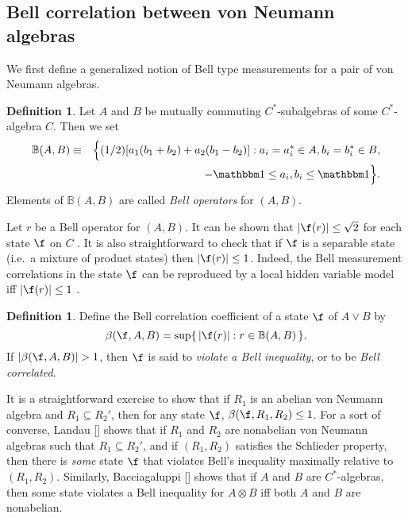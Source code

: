 \documentclass[11pt]{article}
\newcommand{\abs}[1]{|#1|}
\theoremstyle{definition}
\theoremstyle{definition}
\newtheorem{defn}[thm]{Definition}
\theoremstyle{remark}
\def\7#1{{\mathbb #1}}
\def\8#1{{\mathbbm #1}}
\begin{document}
\subsection{Bell correlation between von Neumann algebras}
\label{bell}

We first define a generalized notion of Bell type measurements for a
pair of von Neumann algebras.

\begin{defn} Let $A$ and $B$ be mutually commuting $C^*$-subalgebras
  of some $C^*$-algebra $C$.  Then we set \begin{eqnarray*} \7B (A,B)
    &\equiv & \Bigl\{ (1/2) [a_1(b_1+b_2)+a_2(b_1-b_2)] : a_i=a_i^*\in
    A, b_i=b_i^{*}\in B , \\
&& \ \ -\81 \leq a_{i},b_{i} \leq \81 \Bigr\}
    .\end{eqnarray*} Elements of $\7B (A,B)$ are called \emph{Bell
    operators} for $(A,B)$.
\end{defn}

Let $r$ be a Bell operator for $(A,B)$. It can be shown that $\abs{\f
  (r)}\leq \sqrt{2}$ for each state $\f$ on $C$ \cite{early-sum}.  It
is also straightforward to check that if $\f$ is a separable state
(i.e.\ a mixture of product states) then $\abs{\f (r)}\leq 1$.
Indeed, the Bell measurement correlations in the state $\f$ can be
reproduced by a local hidden variable model iff $\abs{\f (r)}\leq 1$
\cite{early-sum,baebel}.

\begin{defn} Define the Bell correlation coefficient of a state $\f$
  of $A\vee B$ by 
$$ \beta (\f ,A,B) = \sup \{ \, \abs{\f (r) }:r\in \7B (A,B) \,\} . $$
If $\abs{\beta (\f ,A,B)}>1$, then $\f$ is said to \emph{violate a
  Bell inequality}, or to be \emph{Bell correlated}.
\end{defn}

It is a straightforward exercise to show that if $R_1$ is an abelian
von Neumann algebra and $R_1\subseteq R_2'$, then for any state $\f$,
$\beta (\f ,R_1,R_2)\leq 1$.  For a sort of converse, Landau
[\citeyear{lan}] shows that if $R_1$ and $R_2$ are nonabelian von
Neumann algebras such that $R_1\subseteq R_2'$, and if $(R_1,R_2)$
satisfies the Schlieder property, then there is \emph{some} state $\f$
that violates Bell's inequality maximally relative to $(R_1,R_2)$.
Similarly, Bacciagaluppi [\citeyear{bacc}] shows that if $A$ and $B$
are $C^*$-algebras, then some state violates a Bell inequality for
$A\otimes B$ iff both $A$ and $B$ are nonabelian.
\end{document}
